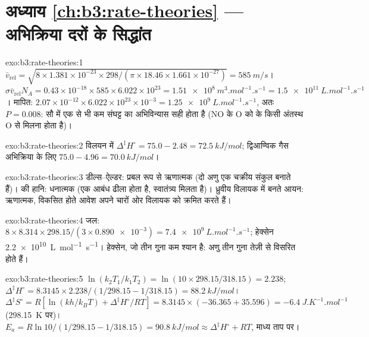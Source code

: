 \section*{अध्याय \ref{ch:b3:rate-theories} --- अभिक्रिया दरों के सिद्धांत}

\begin{solution}{exo:b3:rate-theories:1}
$\bar v_{\mathrm{rel}} = \sqrt{8 \times 1.381\times10^{-23} \times 298/(\pi \times 18.46 \times 1.661\times10^{-27})} = \qty{585}{m/s}$।
$\sigma\bar v_{\mathrm{rel}}N_A = 0.43\times10^{-18} \times 585 \times 6.022\times10^{23} = \qty{1.51e8}{m^3.mol^{-1}.s^{-1}} =
\qty{1.5e11}{L.mol^{-1}.s^{-1}}$। मापित: $2.07\times10^{-12} \times 6.022\times10^{23}\times10^{-3} =
\qty{1.25e9}{L.mol^{-1}.s^{-1}}$, अतः $P = 0.008$: सौ में एक से भी कम संघट्ट का अभिविन्यास
सही होता है (NO के O को  के किसी अंतस्थ O से मिलना होता है)।
\end{solution}

\begin{solution}{exo:b3:rate-theories:2}
विलयन में $\Delta^{\ddagger}H^\circ = 75.0 - 2.48 = \qty{72.5}{kJ/mol}$; द्विआण्विक गैस अभिक्रिया के लिए
$75.0 - 4.96 = \qty{70.0}{kJ/mol}$।
\end{solution}

\begin{solution}{exo:b3:rate-theories:3}
डील्स--ऐल्डर: प्रबल रूप से ऋणात्मक (दो अणु एक चक्रीय संकुल बनाते हैं)।
 की हानि: धनात्मक (एक आबंध ढीला होता है, स्वातंत्र्य मिलता है)। ध्रुवीय विलायक में
बनते आयन: ऋणात्मक, विकसित होते आवेश अपने चारों ओर विलायक को क्रमित करते हैं।
\end{solution}

\begin{solution}{exo:b3:rate-theories:4}
जल: $8 \times 8.314 \times 298.15/(3 \times \num{0.890e-3}) = \qty{7.4e9}{L.mol^{-1}.s^{-1}}$; हेक्सेन
\qty{2.2e10}{L.mol^{-1}.s^{-1}}। हेक्सेन, जो तीन गुना कम श्यान है: अणु तीन
गुना तेज़ी से विसरित होते हैं।
\end{solution}

\begin{solution}{exo:b3:rate-theories:5}
$\ln(k_2T_1/k_1T_2) = \ln(10 \times 298.15/318.15) = 2.238$; $\Delta^{\ddagger}H^\circ = 8.3145 \times 2.238/(1/298.15 -
1/318.15) = \qty{88.2}{kJ/mol}$। $\Delta^{\ddagger}S^\circ = R[\ln(kh/k_BT) + \Delta^{\ddagger}H^\circ/RT] = 8.3145 \times
(-36.365 + 35.596) = \qty{-6.4}{J.K^{-1}.mol^{-1}}$ (\qty{298.15}{K} पर)। $E_a = R\ln10/(1/298.15 - 1/318.15) =
\qty{90.8}{kJ/mol} \approx \Delta^{\ddagger}H^\circ + RT$, माध्य ताप पर।
\end{solution}

